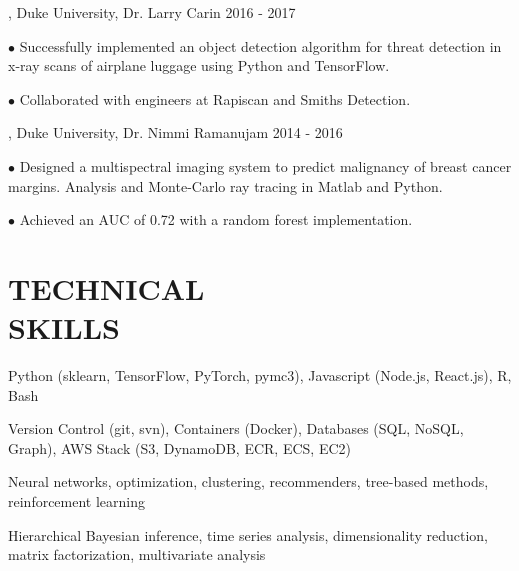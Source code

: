 \documentclass[resmargin, 11pt]{resume_style_class} %
\newenvironment{outline}
  {\begin{list}{}{\setlength{\leftmargin}{30pt}\setlength\itemsep{-2pt}}}
  {\end{list}}
\newenvironment{outline-cond}
  {\begin{list}{}{
  \setlength{\leftmargin}{30pt}
  \setlength\topsep{-10pt}
  \setlength\itemindent{-30pt}
  }}
  {\end{list}}
\begin{document}
\begin{resume}
, Duke University, Dr. Larry Carin \hfill 2016 - 2017
\begin{outline}
	\item[$\bullet$\hspace{0.1cm}] Successfully implemented an object detection algorithm for threat detection in x-ray scans of airplane luggage using Python and TensorFlow.
	\item[$\bullet$\hspace{0.1cm}] Collaborated with engineers at Rapiscan and Smiths Detection.
\end{outline}

, Duke University, Dr. Nimmi Ramanujam \hfill 2014 - 2016
\begin{outline}
\item[$\bullet$\hspace{0.1cm}] Designed a multispectral imaging system to predict malignancy of breast cancer margins. Analysis and Monte-Carlo ray tracing in Matlab and Python.
\item[$\bullet$\hspace{0.1cm}]  Achieved an AUC of 0.72 with a random forest implementation.
\end{outline}


\section{TECHNICAL \\ SKILLS}
\begin{outline-cond} 
\item {} Python (sklearn, TensorFlow, PyTorch, pymc3), Javascript (Node.js, React.js), R, Bash
\item {} Version Control (git, svn), Containers (Docker), Databases (SQL, NoSQL, Graph), AWS Stack (S3, DynamoDB, ECR, ECS, EC2)
\item {}
Neural networks, optimization, clustering, recommenders, tree-based methods, reinforcement learning
\item {}
Hierarchical Bayesian inference, time series analysis, dimensionality reduction, matrix factorization, multivariate analysis
\end{outline-cond}



\end{resume}
\end{document}
